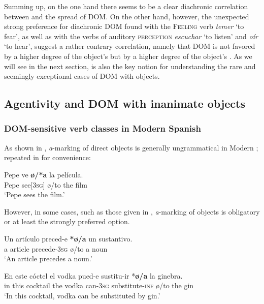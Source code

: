 \documentclass[output=paper]{LSP/langsci}
\begin{document}
Summing up, on the one hand there seems to be a clear diachronic correlation between  and the spread of DOM. On the other hand, however, the unexpected strong preference for diachronic DOM found with the \textsc{Feeling} verb \textit{temer} ‘to fear’, as well as with the verbs of auditory \textsc{perception} \textit{escuchar} ‘to listen’ and \textit{oír} ‘to hear’, suggest a rather contrary correlation, namely that DOM is not favored by a higher degree of the object’s  but by a higher degree of the object’s . As we will see in the next section,  is also the key notion for understanding the rare and seemingly exceptional cases of DOM with  objects.

\subsection{Agentivity and DOM with inanimate objects}\label{08-ga-sec:4.3}

\subsubsection{DOM-sensitive verb classes in Modern Spanish}\label{08-ga-sec:4.3.1}

As shown in , \textit{a}-marking of  direct objects is generally ungrammatical in Modern ; \cf {} repeated in  for convenience:

\ea%
\label{08-ga-ex:3repeat}
\gll Pepe ve \textbf{{ø/*a}} la película.\\
Pepe see[\textsc{3sg]} ø/to the film\\
\glt ‘Pepe sees the film.’
\z

However, in some cases, such as those given in , \textit{a}-marking of  objects is obligatory or at least the strongly preferred option.

\ea\label{08-ga-ex:17}
\ea \label{08-ga-ex:17a}
\gll Un artículo preced-e \textbf{*ø/a} un sustantivo.\\
 a article precede-3\textsc{sg} ø/to a noun\\
\glt ‘An article precedes a noun.’

\ex \label{08-ga-ex:17b}
\gll En este cóctel el vodka pued-e sustitu-ir *\textbf{ø/a} la ginebra.\\
 in this cocktail the vodka can-3\textsc{sg} substitute-\textsc{inf} ø/to the gin\\
\glt ‘In this cocktail, vodka can be substituted by gin.’
\end{document}
